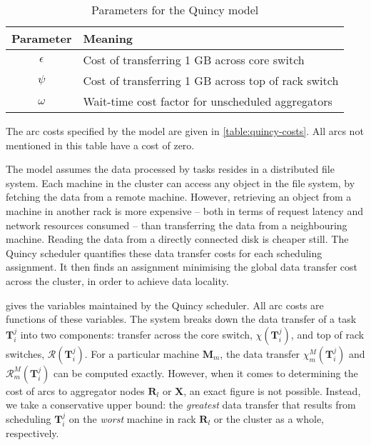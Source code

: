 \begin{table}
    \begin{tabular}{c|l}
        \hline 
        Parameter & Meaning\tabularnewline
        \hline 
        \hline 
        $\epsilon$ & Cost of transferring 1 GB across core switch\tabularnewline
        \hline 
        $\psi$ & Cost of transferring 1 GB across top of rack switch\tabularnewline
        \hline 
        $\omega$ & Wait-time cost factor for unscheduled aggregators\tabularnewline
        \hline 
    \end{tabular}
    \caption{Parameters for the Quincy model}
    \label{table:quincy-parameters}
\end{table}

The arc costs specified by the model are given in \cref{table:quincy-costs}. All arcs not mentioned in this table have a cost of zero\footnotemark.

The model assumes the data processed by tasks resides in a distributed file system. Each machine in the cluster can access any object in the file system, by fetching the data from a remote machine. However, retrieving an object from a machine in another rack is more expensive -- both in terms of request latency and network resources consumed -- than transferring the data from a neighbouring machine. Reading the data from a directly connected disk is cheaper still. The Quincy scheduler quantifies these data transfer costs for each scheduling assignment. It then finds an assignment minimising the global data transfer cost across the cluster, in order to achieve data locality.

 gives the variables maintained by the Quincy scheduler. All arc costs are functions of these variables. The system breaks down the data transfer of a task $\mathbf{T}_{i}^{j}$ into two components: transfer across the core switch, $\chi\left(\mathbf{T}_{i}^{j}\right)$, and top of rack switches, $\mathcal{R}\left(\mathbf{T}_{i}^{j}\right)$. For a particular machine $\mathbf{M}_m$, the data transfer $\chi_{m}^{M}\left(\mathbf{T}_{i}^{j}\right)$ and $\mathcal{R}_{m}^{M}\left(\mathbf{T}_{i}^{j}\right)$ can be computed exactly. However, when it comes to determining the cost of arcs to aggregator nodes $\mathbf{R}_l$ or $\mathbf{X}$, an exact figure is not possible. Instead, we take a conservative upper bound: the \emph{greatest} data transfer that results from scheduling $\mathbf{T}_{i}^{j}$ on the \emph{worst} machine in rack $\mathbf{R}_l$ or the cluster as a whole, respectively.

